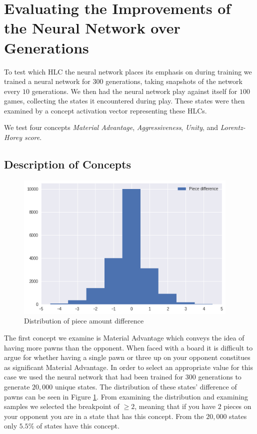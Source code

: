 \section{Evaluating the Improvements of the Neural Network over Generations}

To test which HLC the neural network places its emphasis on during training we trained a neural network for $300$ generations, taking snapshots of the network every $10$ generations. We then had the neural network play against itself for $100$ games, collecting the states it encountered during play. These states were then examined by a concept activation vector representing these HLCs.

We test four concepts \textit{Material Advantage}, \textit{Aggressiveness}, \textit{Unity}, and \textit{Lorentz-Horey score}.

\subsection{Description of Concepts}

\begin{figure}
    \begin{small}
        \begin{center}
            \includegraphics[width=0.95\textwidth]{graphics/dist_number_adv}
        \end{center}
    \end{small}
    \caption{Distribution of piece amount difference}
    \label{fig:distnumberadv}
\end{figure}

The first concept we examine is Material Advantage which conveys the idea of having more pawns than the opponent. When faced with a board it is difficult to argue for whether having a single pawn or three up on your opponent constitues as significant Material Advantage. In order to select an appropriate value for this case we used the neural network that had been trained for $300$ generations to generate $20{,}000$ unique states. The distribution of these states' difference of pawns can be seen in Figure \ref{fig:distnumberadv}. From examining the distribution and examining samples we selected the breakpoint of $\geq 2$, meaning that if you have $2$ pieces on your opponent you are in a state that has this concept. From the $20{,}000$ states only $5.5\%$ of states have this concept.

